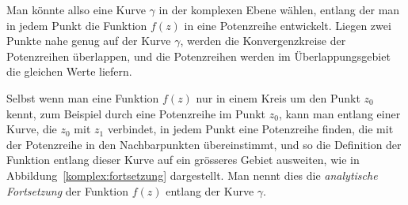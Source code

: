 Man könnte allso eine Kurve $\gamma$ in der komplexen Ebene wählen,
entlang der man in jedem Punkt die Funktion $f(z)$ in eine Potenzreihe
entwickelt.
Liegen zwei Punkte nahe genug auf der Kurve $\gamma$, werden die
Konvergenzkreise der Potenzreihen überlappen, und die Potenzreihen
werden im Überlappungsgebiet die gleichen Werte liefern.

Selbst wenn man eine Funktion $f(z)$ nur in einem Kreis um den Punkt $z_0$
kennt, zum Beispiel durch eine Potenzreihe im Punkt $z_0$, kann man entlang
einer Kurve, die $z_0$ mit $z_1$ verbindet, in jedem Punkt eine Potenzreihe
finden, die mit der Potenzreihe in den Nachbarpunkten übereinstimmt, und
so die Definition der Funktion entlang dieser Kurve auf ein grösseres
Gebiet ausweiten, wie in Abbildung~\ref{komplex:fortsetzung} dargestellt.
Man nennt dies die {\em analytische Fortsetzung} der Funktion $f(z)$
entlang der Kurve $\gamma$.

